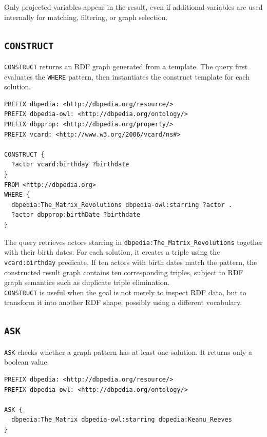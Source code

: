 \documentclass{scrbook}
\begin{document}
	Only projected variables appear in the result, even if additional variables are used internally for matching, filtering, or graph selection.
	
	\newpage
	\subsection{\texttt{CONSTRUCT}}
	
	\texttt{CONSTRUCT} returns an RDF graph generated from a template. The query first evaluates the \texttt{WHERE} pattern, then instantiates the construct template for each solution.
	
	\begin{lstlisting}
PREFIX dbpedia: <http://dbpedia.org/resource/>
PREFIX dbpedia-owl: <http://dbpedia.org/ontology/>
PREFIX dbpprop: <http://dbpedia.org/property/>
PREFIX vcard: <http://www.w3.org/2006/vcard/ns#>

CONSTRUCT {
  ?actor vcard:birthday ?birthdate
}
FROM <http://dbpedia.org>
WHERE {
  dbpedia:The_Matrix_Revolutions dbpedia-owl:starring ?actor .
  ?actor dbpprop:birthDate ?birthdate
}
	\end{lstlisting}
	
	The query retrieves actors starring in \texttt{dbpedia:The\_Matrix\_Revolutions} together with their birth dates. For each solution, it creates a triple using the \texttt{vcard:birthday} predicate. If ten actors with birth dates match the pattern, the constructed result graph contains ten corresponding triples, subject to RDF graph semantics such as duplicate triple elimination.\\
	
	\texttt{CONSTRUCT} is useful when the goal is not merely to inspect RDF data, but to transform it into another RDF shape, possibly using a different vocabulary.
	
	\newpage
	\subsection{\texttt{ASK}}
	
	\texttt{ASK} checks whether a graph pattern has at least one solution. It returns only a boolean value.
	
	\begin{lstlisting}
PREFIX dbpedia: <http://dbpedia.org/resource/>
PREFIX dbpedia-owl: <http://dbpedia.org/ontology/>

ASK {
  dbpedia:The_Matrix dbpedia-owl:starring dbpedia:Keanu_Reeves
}
	\end{lstlisting}
	
\end{document}
